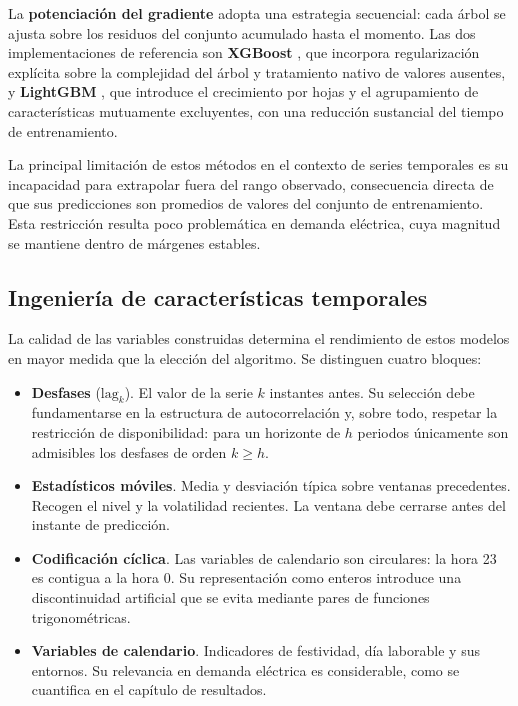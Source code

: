 La \textbf{potenciación del gradiente} adopta una estrategia secuencial: cada
árbol se ajusta sobre los residuos del conjunto acumulado hasta el momento. Las
dos implementaciones de referencia son \textbf{XGBoost}
\parencite{chen2016xgboost}, que incorpora regularización explícita sobre la
complejidad del árbol y tratamiento nativo de valores ausentes, y
\textbf{LightGBM} \parencite{ke2017lightgbm}, que introduce el crecimiento por
hojas y el agrupamiento de características mutuamente excluyentes, con una
reducción sustancial del tiempo de entrenamiento.

La principal limitación de estos métodos en el contexto de series temporales es su
incapacidad para extrapolar fuera del rango observado, consecuencia directa de que
sus predicciones son promedios de valores del conjunto de entrenamiento. Esta
restricción resulta poco problemática en demanda eléctrica, cuya magnitud se
mantiene dentro de márgenes estables.

\subsection{Ingeniería de características temporales}

La calidad de las variables construidas determina el rendimiento de estos modelos
en mayor medida que la elección del algoritmo. Se distinguen cuatro bloques:

\begin{itemize}
  \item \textbf{Desfases} ($\text{lag}_k$). El valor de la serie $k$ instantes
        antes. Su selección debe fundamentarse en la estructura de autocorrelación
        y, sobre todo, respetar la restricción de disponibilidad: para un
        horizonte de $h$ periodos únicamente son admisibles los desfases de orden
        $k \geq h$.

  \item \textbf{Estadísticos móviles}. Media y desviación típica sobre ventanas
        precedentes. Recogen el nivel y la volatilidad recientes. La ventana debe
        cerrarse antes del instante de predicción.

  \item \textbf{Codificación cíclica}. Las variables de calendario son
        circulares: la hora 23 es contigua a la hora 0. Su representación como
        enteros introduce una discontinuidad artificial que se evita mediante
        pares de funciones trigonométricas.

  \item \textbf{Variables de calendario}. Indicadores de festividad, día
        laborable y sus entornos. Su relevancia en demanda eléctrica es
        considerable, como se cuantifica en el capítulo de resultados.
\end{itemize}


